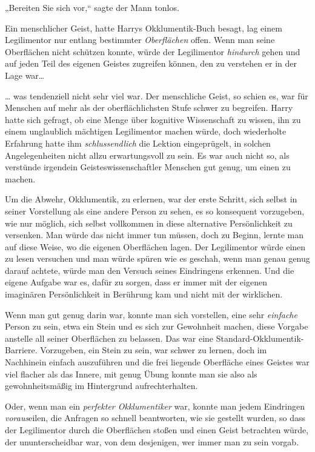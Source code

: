 {„Bereiten Sie sich vor,“ sagte der Mann tonlos.

Ein menschlicher Geist, hatte Harrys Okklumentik-Buch besagt, lag einem Legilimentor nur entlang bestimmter \emph{Oberflächen} offen. Wenn man seine Oberflächen nicht schützen konnte, würde der Legilimentor \emph{hindurch} gehen und auf jeden Teil des eigenen Geistes zugreifen können, den zu verstehen er in der Lage war…

… was tendenziell nicht sehr viel war. Der menschliche Geist, so schien es, war für Menschen auf mehr als der oberflächlichsten Stufe schwer zu begreifen. Harry hatte sich gefragt, ob eine Menge über kognitive Wissenschaft zu wissen, ihn zu einem unglaublich mächtigen Legilimentor machen würde, doch wiederholte Erfahrung hatte ihm \emph{schlussendlich} die Lektion eingeprügelt, in solchen Angelegenheiten nicht allzu erwartungsvoll zu sein. Es war auch nicht so, als verstünde irgendein Geisteswissenschaftler Menschen gut genug, um einen zu machen.

Um die Abwehr, Okklumentik, zu erlernen, war der erste Schritt, sich selbst in seiner Vorstellung als eine andere Person zu sehen, es so konsequent vorzugeben, wie nur möglich, sich selbst vollkommen in diese alternative Persönlichkeit zu versenken. Man würde das nicht immer tun müssen, doch zu Beginn, lernte man auf diese Weise, wo die eigenen Oberflächen lagen. Der Legilimentor würde einen zu lesen versuchen und man würde spüren wie es geschah, wenn man genau genug darauf achtete, würde man den Versuch seines Eindringens erkennen. Und die eigene Aufgabe war es, dafür zu sorgen, dass er immer mit der eigenen imaginären Persönlichkeit in Berührung kam und nicht mit der wirklichen.

Wenn man gut genug darin war, konnte man sich vorstellen, eine sehr \emph{einfache} Person zu sein, etwa ein Stein und es sich zur Gewohnheit machen, diese Vorgabe anstelle all seiner Oberflächen zu belassen. Das war eine Standard-Okklumentik-Barriere. Vorzugeben, ein Stein zu sein, war schwer zu lernen, doch im Nachhinein einfach auszuführen und die frei liegende Oberfläche eines Geistes war viel flacher als das Innere, mit genug Übung konnte man sie also als gewohnheitsmäßig im Hintergrund aufrechterhalten.

Oder, wenn man ein \emph{perfekter Okklumentiker} war, konnte man jedem Eindringen \emph{voraus}eilen, die Anfragen so schnell beantworten, wie sie gestellt wurden, so dass der Legilimentor durch die Oberflächen stoßen und einen Geist betrachten würde, der ununterscheidbar war, von dem desjenigen, wer immer man zu sein vorgab.

}
